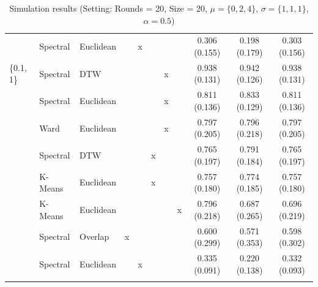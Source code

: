 \documentclass[12pt,a4paper,bibliography=totocnumbered,listof=totocnumbered]{scrartcl}
\begin{document}
{\begin{appendix}
\begin{table}[H]
\begin{tabularx}{\textwidth}{ lllcccccccc}
		& Spectral & Euclidean &  & x &  &  &  & 0.306 (0.155) & 0.198 (0.179) & 0.303 (0.156) \\ 
		\{0.1, 1\} & Spectral & DTW &  &  &  & x &  & 0.938 (0.131) & 0.942 (0.126) & 0.938 (0.131) \\ 
		& Spectral & Euclidean &  &  &  & x &  & 0.811 (0.136) & 0.833 (0.129) & 0.811 (0.136) \\ 
		& Ward  & Euclidean &  &  &  & x &  & 0.797 (0.205) & 0.796 (0.218) & 0.797 (0.205) \\ 
		& Spectral & DTW &  &  & x &  &  & 0.765 (0.197) & 0.791 (0.184) & 0.765 (0.197) \\ 
		& K-Means & Euclidean &  &  & x &  &  & 0.757 (0.180) & 0.774 (0.185) & 0.757 (0.180) \\ 
		& K-Means & Euclidean &  &  &  &  & x & 0.796 (0.218) & 0.687 (0.265) & 0.696 (0.219) \\ 
		& Spectral & Overlap & x &  &  &  &  & 0.600 (0.299) & 0.571 (0.353) & 0.598 (0.302) \\ 
		& Spectral & Euclidean &  & x &  &  &  & 0.335 (0.091) & 0.220 (0.138) & 0.332 (0.093) \\ 
		\hline \\[-1.8ex] 
		\end{tabularx} 
			\caption{Simulation results (Setting: Rounds = 20, Size = 20, $\mu = \{0,2,4\}$, $\sigma =  \{1,1,1\}$, $\alpha = 0.5$)} 
			\label{tab:apstab2}	
		\end{table}
	

\end{appendix}}
\end{document}
